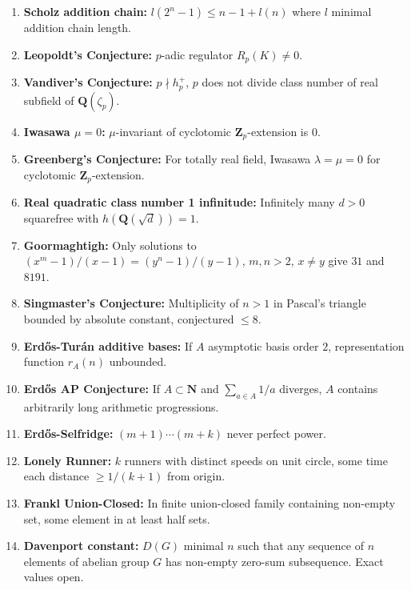 \documentclass[aps,prd,amsmath,amssymb,twocolumn,superscriptaddress]{revtex4-2}
\begin{document}
\begin{enumerate}[label={\bf \arabic*.}, leftmargin=*, itemsep=2pt]
\item \textbf{Scholz addition chain:} $l(2^n-1)\le n-1+l(n)$ where $l$ minimal addition chain length.

\item \textbf{Leopoldt's Conjecture:} $p$-adic regulator $R_p(K)\neq0$.

\item \textbf{Vandiver's Conjecture:} $p\nmid h^+_p$, $p$ does not divide class number of real subfield of $\mathbf Q(\zeta_p)$.

\item \textbf{Iwasawa $\mu=0$:} $\mu$-invariant of cyclotomic $\mathbf Z_p$-extension is $0$.

\item \textbf{Greenberg's Conjecture:} For totally real field, Iwasawa $\lambda=\mu=0$ for cyclotomic $\mathbf Z_p$-extension.

\item \textbf{Real quadratic class number 1 infinitude:} Infinitely many $d>0$ squarefree with $h(\mathbf Q(\sqrt d))=1$.

\item \textbf{Goormaghtigh:} Only solutions to $(x^m-1)/(x-1)=(y^n-1)/(y-1)$, $m,n>2$, $x\neq y$ give $31$ and $8191$.

\item \textbf{Singmaster's Conjecture:} Multiplicity of $n>1$ in Pascal's triangle bounded by absolute constant, conjectured $\le8$.

\item \textbf{Erd\H{o}s-Tur\'an additive bases:} If $A$ asymptotic basis order $2$, representation function $r_A(n)$ unbounded.

\item \textbf{Erd\H{o}s AP Conjecture:} If $A\subset\mathbf N$ and $\sum_{a\in A}1/a$ diverges, $A$ contains arbitrarily long arithmetic progressions.

\item \textbf{Erd\H{o}s-Selfridge:} $(m+1)\cdots(m+k)$ never perfect power.

\item \textbf{Lonely Runner:} $k$ runners with distinct speeds on unit circle, some time each distance $\ge1/(k+1)$ from origin.

\item \textbf{Frankl Union-Closed:} In finite union-closed family containing non-empty set, some element in at least half sets.

\item \textbf{Davenport constant:} $D(G)$ minimal $n$ such that any sequence of $n$ elements of abelian group $G$ has non-empty zero-sum subsequence. Exact values open.


\end{enumerate}
\end{document}
